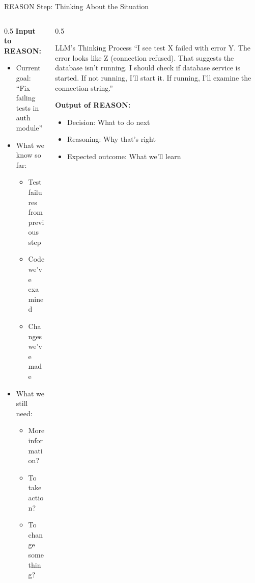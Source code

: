 \documentclass[aspectratio=169, 11pt]{beamer}
\begin{document}
\begin{frame}{REASON Step: Thinking About the Situation}
    \begin{columns}[T]
        \begin{column}{0.5\textwidth}
            \textbf{Input to REASON:}
            \begin{itemize}
                \item Current goal: ``Fix failing tests in auth module''
                \item What we know so far:
                \begin{itemize}
                    \item Test failures from previous step
                    \item Code we've examined
                    \item Changes we've made
                \end{itemize}
                \item What we still need:
                \begin{itemize}
                    \item More information?
                    \item To take action?
                    \item To change something?
                \end{itemize}
            \end{itemize}
        \end{column}
        \begin{column}{0.5\textwidth}
            \begin{exampleblock}{LLM's Thinking Process}
                \footnotesize
                ``I see test X failed with error Y.
                The error looks like Z (connection refused).
                That suggests the database isn't running.
                I should check if database service is started.
                If not running, I'll start it.
                If running, I'll examine the connection string.''
            \end{exampleblock}

            \vspace{0.3cm}
            \textbf{Output of REASON:}
            \begin{itemize}
                \item Decision: What to do next
                \item Reasoning: Why that's right
                \item Expected outcome: What we'll learn
            \end{itemize}
        \end{column}
    \end{columns}

\end{frame}
\end{document}
